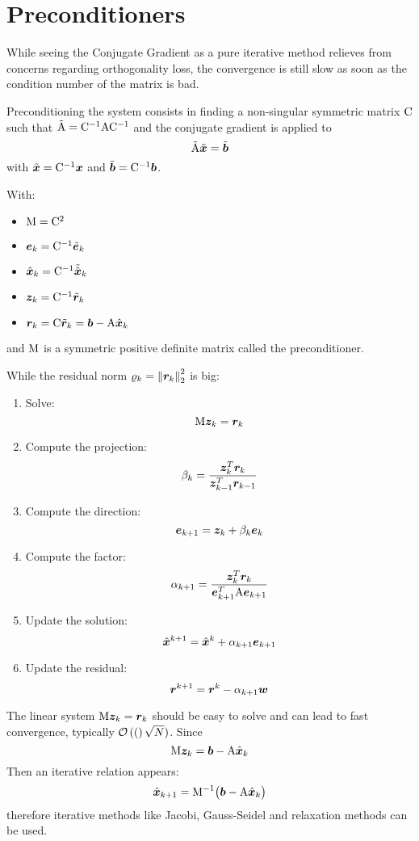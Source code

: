 \section{Preconditioners}

While seeing the Conjugate Gradient as a pure iterative method relieves from concerns regarding orthogonality loss, the convergence is still slow as soon as the condition number of the matrix is bad.

\medskip
Preconditioning the system consists in finding a non-singular symmetric matrix ${\mathrm C}$ such that $\tilde {{\mathrm A}} = {\mathrm C}^{-1}{\mathrm A}{\mathrm C}^{-1}$ and the conjugate gradient is applied to
\[
\tilde{{\mathrm A}} \tilde{{\boldsymbol x}} = \tilde{{\boldsymbol b}}
\]
with $\tilde{{\boldsymbol x}} = {\mathrm C}^{-1}{\boldsymbol x}$ and $\tilde{{\boldsymbol b}} = {\mathrm C}^{-1}{\boldsymbol b}$.

\medskip
With:
\begin{itemize}
\item ${\mathrm M} = {\mathrm C}^2$
\item ${\boldsymbol e}_k = {\mathrm C}^{-1}\tilde{{\boldsymbol e}}_k$
\item $\hat{\boldsymbol x}_k = {\mathrm C}^{-1}\tilde{\hat{\boldsymbol x}}_k$
\item ${\boldsymbol z}_k = {\mathrm C}^{-1}\tilde{{\boldsymbol r}}_k$
\item ${\boldsymbol r}_k = {\mathrm C}\tilde{{\boldsymbol r}}_k = {\boldsymbol b} - {\mathrm A}\hat{\boldsymbol x}_k$
\end{itemize}
and ${\mathrm M}$ is a symmetric positive definite matrix called the preconditioner.

\medskip
While the residual norm $\varrho_k = {\lVert {\boldsymbol r}_k \rVert}^2_2$ is big:
\begin{enumerate}

\item Solve:
\[
{\mathrm M}{\boldsymbol z}_{k} = {\boldsymbol r}_k
\]
\item Compute the projection:
\[
\beta_k = \frac{{\boldsymbol z}_{k}^T{\boldsymbol r}_k}{{\boldsymbol z}_{k-1}^T{\boldsymbol r}_{k-1}}
\]
\item Compute the direction:
\[
{\boldsymbol e}_{k+1} = {\boldsymbol z}_k + \beta_k{\boldsymbol e}_k
\]
\item Compute the factor:
\[
\alpha_{k+1} = \frac{{\boldsymbol z}_{k}^T{\boldsymbol r}_k}{{\boldsymbol e}^T_{k+1}{\mathrm A}{\boldsymbol e}_{k+1}}
\]
\item Update the solution:
\[
\hat{\boldsymbol x}^{k+1} = \hat{\boldsymbol x}^k + \alpha_{k+1} {\boldsymbol e}_{k+1}
\]
\item Update the residual:
\[
{\boldsymbol r}^{k+1} = {\boldsymbol r}^k - \alpha_{k+1} {\boldsymbol w}
\]
\end{enumerate}

\medskip
The linear system ${\mathrm M}{\boldsymbol z}_{k} = {\boldsymbol r}_k$ should be easy to solve and can lead to fast convergence, typically $\mathcal{O}\left((\right)\sqrt{N})$.
Since
\[
{\mathrm M}{\boldsymbol z}_{k} = {\boldsymbol b} - {\mathrm A}\hat{\boldsymbol x}_k
\]
Then an iterative relation appears:
\[
\hat{\boldsymbol x}_{k+1} = {\mathrm M}^{-1}\bigl({\boldsymbol b} - {\mathrm A}\hat{\boldsymbol x}_k\bigr)
\]
therefore iterative methods like Jacobi, Gauss-Seidel and relaxation methods can be used.


